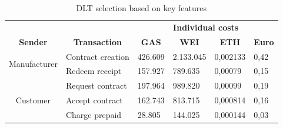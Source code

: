 \documentclass[conference]{IEEEtran}
\begin{document}
\begin{table}[!htbp]
\centering
\caption{DLT selection based on key features}
\begin{tabular}{clllll}
\textbf{}                     & \multicolumn{1}{c}{\textbf{}}            & \multicolumn{4}{c}{\textbf{Individual costs}}                                                                                              \\
\textbf{Sender}               & \multicolumn{1}{c}{\textbf{Transaction}} & \multicolumn{1}{c}{\textbf{GAS}} & \multicolumn{1}{c}{\textbf{WEI}} & \multicolumn{1}{c}{\textbf{ETH}} & \multicolumn{1}{c}{\textbf{Euro}} \\
\multirow{2}{*}{Manufacturer} & Contract creation                        & 426.609                          & 2.133.045                        & 0,002133                         & 0,42                              \\
                              & Redeem receipt                           & 157.927                          & 789.635                          & 0,00079                          & 0,15                              \\
\multirow{3}{*}{Customer}     & Request contract                         & 197.964                          & 989.820                          & 0,00099                          & 0,19                              \\
                              & Accept contract                          & 162.743                          & 813.715                          & 0,000814                         & 0,16                              \\
                              & Charge prepaid                           & 28.805                           & 144.025                          & 0,000144                         & 0,03                             
\end{tabular}
\end{table}
\end{document}
